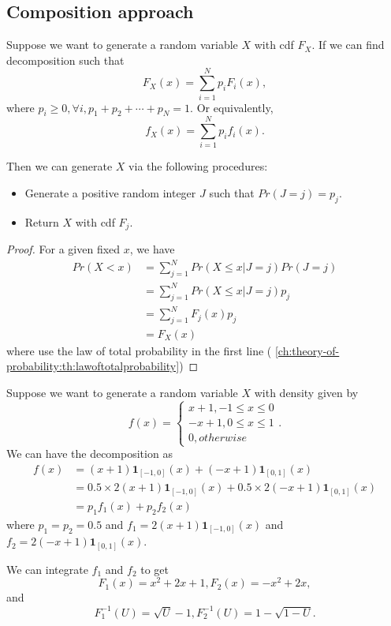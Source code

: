 \begin{refsection}
\subsection{Composition approach}
\begin{lemma}
	Suppose we want to generate a random variable $X$ with cdf $F_X$. If we can find decomposition such that
	$$F_X(x) = \sum_{i=1}^{N} p_i F_i(x),$$
	where $p_i\geq 0, \forall i, p_1+p_2+ \cdots + p_N = 1$.
	Or equivalently, 
	$$f_X(x) = \sum_{i=1}^{N} p_i f_i(x).$$
	
	Then we can generate $X$ via the following procedures:
	\begin{itemize}
		\item Generate a positive random integer $J$ such that $Pr(J=j) = p_j$.
		\item Return $X$ with cdf $F_j$.
	\end{itemize}
\end{lemma}
\begin{proof}
For a given fixed $x$, we have
\begin{align*}
Pr(X < x) &= \sum_{j=1}^{N} Pr(X\leq x|J=j)Pr(J=j) \\
&=\sum_{j=1}^{N} Pr(X\leq x|J=j)p_j \\
&=\sum_{j=1}^{N} F_j(x)p_j \\
&=F_X(x)
\end{align*}	
where use the law of total probability in the first line ( \autoref{ch:theory-of-probability:th:lawoftotalprobability})
\end{proof}

\begin{example}
Suppose we want to generate a random variable $X$ with density given by
$$f(x) = \begin{cases*}
x+1, -1\leq x \leq 0\\
-x+1, 0\leq x\leq 1\\
0, otherwise
\end{cases*}.$$	
We can have the decomposition as
\begin{align*}
f(x) &= (x+1) \bm{1}_{[-1,0]}(x) + (-x+1)\bm{1}_{[0,1]}(x) \\
&= 0.5 \times 2(x+1) \bm{1}_{[-1,0]}(x) + 0.5\times 2(-x+1)\bm{1}_{[0,1]}(x) \\
&= p_1f_1(x) + p_2f_2(x)
\end{align*}
where $p_1=p_2=0.5$ and $f_1 = 2(x+1) \bm{1}_{[-1,0]}(x)$ and $f_2=2(-x+1)\bm{1}_{[0,1]}(x)$.

We can integrate $f_1$ and $f_2$ to get
$$F_1(x) = x^2+2x+1, F_2(x) = -x^2+2x,$$
and
$$F_1^{-1}(U)=\sqrt{U}-1, F_2^{-1}(U) = 1 - \sqrt{1-U}.$$


\end{example}
\end{refsection}
